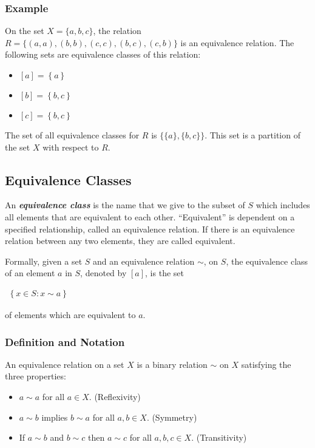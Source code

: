 \begin{multicols}{2}
\subsubsection{Example}

On the set $X = \{a,b,c\}$, the relation $R = \{(a, a), (b, b), (c, c), (b, c), (c, b)\}$ is an equivalence relation. The following sets are equivalence classes of this relation:
\begin{multicols}{3}
    \begin{itemize}
        \item $\left[ a \right] = \left\{ a \right\}$
        \item $\left[ b \right] = \left\{ b, c \right\}$
        \item $\left[ c \right] = \left\{ b, c \right\}$
    \end{itemize}
\end{multicols}
\noindent The set of all equivalence classes for $R$ is $\{ \{a\}, \{b,c\} \}$. This set is a partition of the set $X$ with respect to $R$.

\newpage
\subsection{Equivalence Classes}

An \textbf{\textit{equivalence class}} is the name that we give to the subset of $S$ which includes all elements that are equivalent to each other. ``Equivalent'' is dependent on a specified relationship, called an equivalence relation. If there is an equivalence relation between any two elements, they are called equivalent.

Formally, given a set $S$ and an equivalence relation $\sim$, on $S$, the equivalence class of an element $a$ in $S$, denoted by $\left[ a \right]$, is the set

$\begin{aligned}
    \left\{ x \in S : x \sim a \right\}
\end{aligned}$

\noindent of elements which are equivalent to $a$.

\subsubsection{Definition and Notation}

An equivalence relation on a set $X$ is a binary relation $\sim$ on $X$ satisfying the three properties:
\begin{itemize}
    \item $a \sim a$ for all $a \in X$. (Reflexivity)
    \item $a \sim b$ implies $b \sim a$ for all $a, b \in X$. (Symmetry)
    \item If $a \sim b$ and $b \sim c$ then $a \sim c$ for all $a, b, c \in X$. (Transitivity)
\end{itemize}


\end{multicols}
